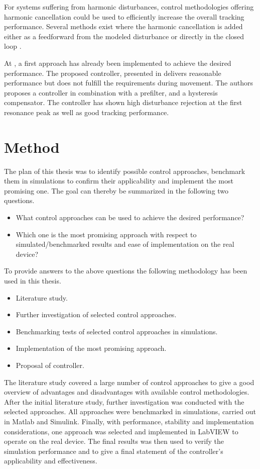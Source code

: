 For systems suffering from harmonic disturbances, control methodologies offering harmonic cancellation could be used to efficiently increase the overall tracking performance. Several methods exist where the harmonic cancellation is added either as a feedforward from the modeled disturbance \citep{fujimoto2009rro, vilanova2008disturbance} or directly in the closed loop \citep{IMP:Perry}.

At \abbrCERN, a first approach has already been implemented to achieve the desired performance. The proposed controller, presented in \citep{ButcherController:2015} delivers reasonable performance but does not fulfill the requirements during movement. The authors proposes a \abbrPID controller in combination with a prefilter, and a hysteresis compensator. The controller has shown high disturbance rejection at the first resonance peak as well as good tracking performance.

\section{Method}
The plan of this thesis was to identify possible control approaches, benchmark them in simulations to confirm their applicability and implement the most promising one. The goal can thereby be summarized in the following two questions.

\begin{itemize}
  \item What control approaches can be used to achieve the desired performance?
  \item Which one is the most promising approach with respect to simulated/benchmarked results and ease of implementation on the real device?
\end{itemize}

To provide answers to the above questions the following methodology has been used in this thesis.

\begin{itemize}
  \item Literature study.
  \item Further investigation of selected control approaches.
  \item Benchmarking tests of selected control approaches in simulations.
  \item Implementation of the most promising approach.
  \item Proposal of controller.
\end{itemize}

The literature study covered a large number of control approaches to give a good overview of advantages and disadvantages with available control methodologies. After the initial literature study, further investigation was conducted with the selected approaches. All approaches were benchmarked in simulations, carried out in Matlab and Simulink. Finally, with performance, stability and implementation considerations, one approach was selected and implemented in LabVIEW to operate on the real device. The final results was then used to verify the simulation performance and to give a final statement of the controller's applicability and effectiveness.

